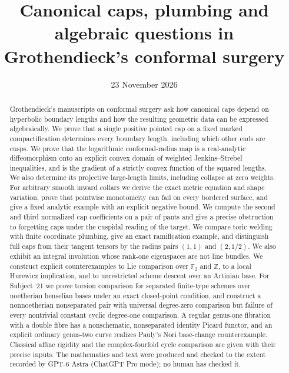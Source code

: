 \documentclass[11pt,a4paper]{article}
\title{Canonical caps, plumbing and algebraic questions in Grothendieck's conformal surgery}
\author{}
\date{23 November 2026}
\theoremstyle{definition}
\newcommand{\Z}{\mathbb Z}
\newcommand{\F}{\mathbb F}
\begin{document}
\maketitle
\begin{abstract}
Grothendieck's manuscripts on conformal surgery ask how canonical caps depend on hyperbolic boundary lengths and how the resulting geometric data can be expressed algebraically. We prove that a single positive pointed cap on a fixed marked compactification determines every boundary length, including which other ends are cusps. We prove that the logarithmic conformal-radius map is a real-analytic diffeomorphism onto an explicit convex domain of weighted Jenkins--Strebel inequalities, and is the gradient of a strictly convex function of the squared lengths. We also determine its projective large-length limits, including collapse at zero weights. For arbitrary smooth inward collars we derive the exact metric equation and shape variation, prove that pointwise monotonicity can fail on every bordered surface, and give a fixed analytic example with an explicit negative bound. We compute the second and third normalized cap coefficients on a pair of pants and give a precise obstruction to forgetting caps under the cuspidal reading of the target. We compare toric welding with finite coordinate plumbing, give an exact ramification example, and distinguish full caps from their tangent tensors by the radius pairs $(1,1)$ and $(2,1/2)$. We also exhibit an integral involution whose rank-one eigenspaces are not line bundles. We construct explicit counterexamples to Lie comparison over $\F_2$ and $\Z$, to a local Hurewicz implication, and to unrestricted scheme descent over an Artinian base. For Subject~21 we prove torsion comparison for separated finite-type schemes over noetherian henselian bases under an exact closed-point condition, and construct a nonnoetherian nonseparated pair with universal degree-zero comparison but failure of every nontrivial constant cyclic degree-one comparison. A regular genus-one fibration with a double fibre has a nonschematic, nonseparated identity Picard functor, and an explicit ordinary genus-two curve realizes Pauly's Nori base-change counterexample. Classical affine rigidity and the complex-fourfold cycle comparison are given with their precise inputs. The mathematics and text were produced and checked to the extent recorded by GPT-6 Astra (ChatGPT Pro mode); no human has checked it.
\end{abstract}
\end{document}
